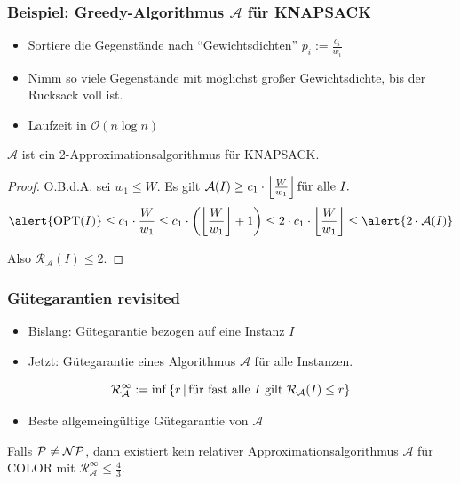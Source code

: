 \begin{frame}
	\frametitle{Beispiel: Greedy-Algorithmus $\mathcal{A}$ für KNAPSACK}
	
	\begin{itemize}
		\item Sortiere die Gegenstände nach "`Gewichtsdichten"' $p_i := \frac{c_i}{w_i}$
		\item Nimm so viele Gegenstände mit möglichst großer Gewichtsdichte, bis der Rucksack voll ist.
		\item Laufzeit in $\mathcal{O}(n \log{n})$
	\end{itemize}
	
	\pause
	
	\begin{theorem}
		$\mathcal{A}$ ist ein 2-Approximationsalgorithmus für KNAPSACK.
	\end{theorem}
	
	\pause
	
	\begin{proof}
		O.B.d.A. sei $w_1 \leq W$. Es gilt $\mathcal{A}(I) \geq c_1 \cdot \left\lfloor \frac{W}{w_1} \right\rfloor \text{für alle }I.$ \pause 
		$$\alert{\opt{I}} \leq c_1 \cdot \frac{W}{w_1} \leq c_1 \cdot \left(  \left\lfloor \frac{W}{w_1} \right\rfloor + 1 \right) \leq 2 \cdot c_1 \cdot \left\lfloor \frac{W}{w_1} \right\rfloor \leq \alert{2 \cdot \A{I}}$$
		
		Also $\mathcal{R}_\mathcal{A}(I) \leq 2$.
	\end{proof}
\end{frame}

\begin{frame}
	\frametitle{Gütegarantien revisited}
	
	\begin{itemize}
		\item Bislang: Gütegarantie bezogen auf eine Instanz $I$
		\item Jetzt: Gütegarantie eines Algorithmus $\mathcal{A}$ für alle Instanzen.
	\end{itemize}
	
	$$\mathcal{R}_\mathcal{A}^\infty := \inf\left\lbrace r \,\middle\vert\, \text{für fast alle } I \text { gilt } \mathcal{R}_\mathcal{A}(I) \leq r \right\rbrace$$
	
	\begin{itemize}
		\item Beste allgemeingültige Gütegarantie von $\mathcal{A}$
	\end{itemize}
	
	\pause
	
	\begin{theorem}
		Falls $\mathcal{P}{} \neq \mathcal{NP}{}$, dann existiert kein relativer Approximationsalgorithmus $\mathcal{A}$ für COLOR mit $\mathcal{R}_\mathcal{A}^\infty \leq \frac{4}{3}$.
	\end{theorem}
\end{frame}

